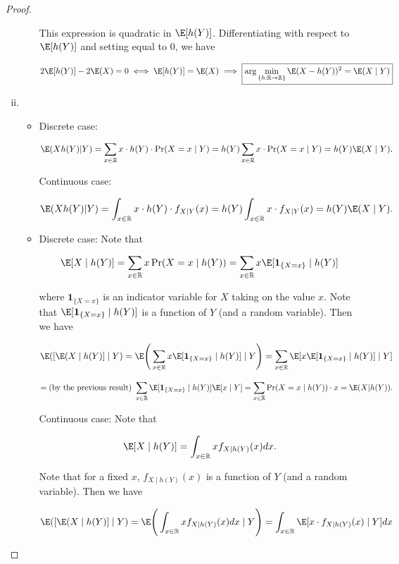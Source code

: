\begin{proof}
\begin{enumerate}[(i)]
\begin{itemize}
This expression is quadratic in \(\E[h(Y)]\). Differentiating with respect to \(\E[h(Y)]\) and setting equal to 0, we have

\[
2\E[h(Y)] - 2 \E(X) = 0 \iff \E[h(Y)] = \E(X) \implies \boxed{  \arg \min_{\{h: \mathbb{R}\to\mathbb{R} \}} \E(X - h(Y))^2  = \E(X \mid Y)}
\]


\end{itemize}
\item 

\begin{itemize}

\item Discrete case:

\[
\E(Xh(Y)|Y)= \sum_{x \in \mathbb{R}} x \cdot h(Y) \cdot \Pr(X = x \mid Y)  =h(Y) \sum_{x \in \mathbb{R}} x  \cdot \Pr(X = x \mid Y) =h(Y) \E(X \mid Y).
\]


Continuous case:

\[
\E(Xh(Y)|Y)= \int_{x \in \mathbb{R}} x \cdot h(Y) \cdot f_{X \mid Y}(x)  =h(Y) \int_{x \in \mathbb{R}} x  \cdot  f_{X \mid Y}(x)=h(Y) \E(X \mid Y).
\]


\item 

Discrete case: Note that

\[
 \E [X \mid h(Y)] = \sum_{x \in \mathbb{R}} x \Pr(X = x \mid h(Y))  = \sum_{x \in \mathbb{R}} x \E [\boldsymbol{1}_{\{X = x\}} \mid h(Y) ]
\]

where \(\boldsymbol{1}_{\{X = x\}}\) is an indicator variable for \(X\) taking on the value \(x\). Note that \( \E [\boldsymbol{1}_{\{X = x\}} \mid h(Y) ]\) is a function of \(Y\) (and a random variable). Then we have


\[
\E([\E (X \mid h(Y)]   \mid Y) = \E\Bigg( \sum_{x \in \mathbb{R}} x \E [\boldsymbol{1}_{\{X = x\}} \mid h(Y) ] \mid Y \Bigg) =  \sum_{x \in \mathbb{R}}  \E[ x \E [\boldsymbol{1}_{\{X = x\}} \mid h(Y) ]  \mid Y] 
\]

\[
= \text{(by the previous result) } \sum_{x \in \mathbb{R}}   \E  [\boldsymbol{1}_{\{X = x\}} \mid h(Y) ] \E[ x   \mid Y]  = \sum_{x \in \mathbb{R}}\Pr(X = x \mid h(Y)) \cdot x  =\E (X|h(Y)).
\]

Continuous case: Note that

\[
 \E [X \mid h(Y)] = \int_{x \in \mathbb{R}} x f_{X \mid h(Y)}(x) dx  .
\]

Note that for a fixed \(x\), \(f_{X \mid h(Y)}(x)\) is a function of \(Y\) (and a random variable). Then we have

\[
\E([\E (X \mid h(Y)]   \mid Y) = \E\Bigg(  \int_{x \in \mathbb{R}} x f_{X \mid h(Y)}(x) dx  \mid Y \Bigg) =  \int_{x \in \mathbb{R}}  \E[ x \cdot f_{X \mid h(Y)}(x)   \mid Y] dx 
\]


\end{itemize}
\end{enumerate}
\end{proof}
